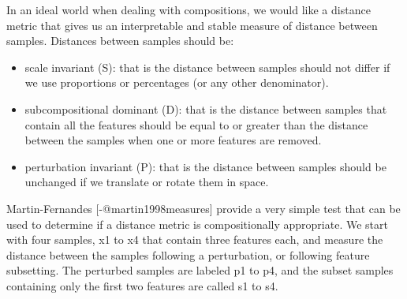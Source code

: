 \documentclass[
  onecolumn]{article}
\providecommand{\tightlist}{%
  \setlength{\itemsep}{0pt}\setlength{\parskip}{0pt}}
\begin{document}
In an ideal world when dealing with compositions, we would like a distance metric that gives us an interpretable and stable measure of distance between samples. Distances between samples should be:

\begin{itemize}
\tightlist
\item
  scale invariant (S): that is the distance between samples should not differ if we use proportions or percentages (or any other denominator).
\item
  subcompositional dominant (D): that is the distance between samples that contain all the features should be equal to or greater than the distance between the samples when one or more features are removed.
\item
  perturbation invariant (P): that is the distance between samples should be unchanged if we translate or rotate them in space.
\end{itemize}

Martin-Fernandes {[}-@martin1998measures{]} provide a very simple test that can be used to determine if a distance metric is compositionally appropriate. We start with four samples, x1 to x4 that contain three features each, and measure the distance between the samples following a perturbation, or following feature subsetting. The perturbed samples are labeled p1 to p4, and the subset samples containing only the first two features are called s1 to s4.
\end{document}
